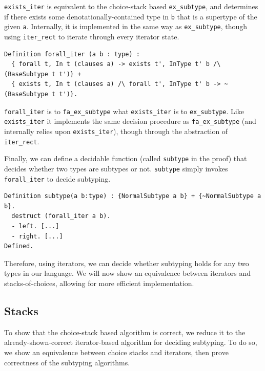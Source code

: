 \documentclass[a4paper,english]{lipics-v2019}
\begin{document}
\verb|exists_iter| is equivalent to the choice-stack based \verb|ex_subtype|,
and determines if there exists some denotationally-contained type in \verb|b|
that is a supertype of the given \verb|a|. Internally, it is implemented in 
the same way as \verb|ex_subtype|, though using \verb|iter_rect| to iterate 
through every iterator state.

\begin{small}\begin{verbatim}
Definition forall_iter (a b : type) :
  { forall t, In t (clauses a) -> exists t', InType t' b /\ (BaseSubtype t t')} +
  { exists t, In t (clauses a) /\ forall t', InType t' b -> ~ (BaseSubtype t t')}.
\end{verbatim}\end{small}

\verb|forall_iter| is to \verb|fa_ex_subtype| what \verb|exists_iter| is to
\verb|ex_subtype|. Like \verb|exists_iter| it implements the same decision procedure
as \verb|fa_ex_subtype| (and internally relies upon \verb|exists_iter|), though through
the abstraction of \verb|iter_rect|.

Finally, we can define a decidable function (called \verb|subtype| in the proof)
that decides whether two types are subtypes or not. \verb|subtype| simply invokes
\verb|forall_iter| to decide subtyping.

\begin{small}\begin{verbatim}
Definition subtype(a b:type) : {NormalSubtype a b} + {~NormalSubtype a b}.
  destruct (forall_iter a b).
  - left. [...]
  - right. [...]
Defined.
\end{verbatim}\end{small}

\noindent Therefore, using iterators, we can decide whether subtyping holds for any two types
in our language. We will now show an equivalence between iterators and stacks-of-choices,
allowing for more efficient implementation.

\subsection{Stacks}

To show that the choice-stack based algorithm is correct, we reduce it to the
already-shown-correct iterator-based algorithm for deciding subtyping. To do so,
we show an equivalence between choice stacks and iterators, then prove correctness
of the subtyping algorithms.
\end{document}

